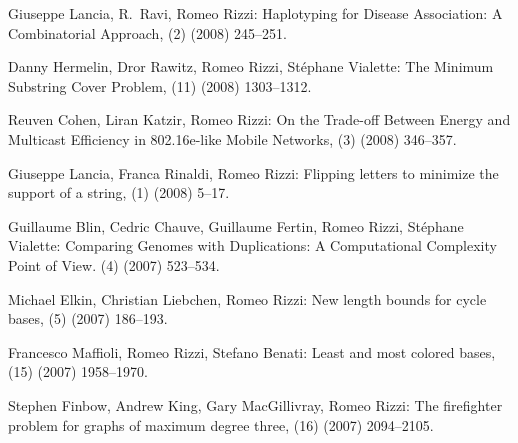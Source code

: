\begin{etaremune}
  \item {\sc Giuseppe Lancia, R.~Ravi, Romeo Rizzi:}
   \newblock  Haplotyping for Disease Association: A Combinatorial Approach, 
   (2) (2008) 245--251.

  \item {\sc Danny Hermelin, Dror Rawitz, Romeo Rizzi, St\'ephane Vialette:}
   \newblock  The Minimum Substring Cover Problem,
   (11) (2008) 1303--1312.

  \item {\sc Reuven Cohen, Liran Katzir, Romeo Rizzi:}
   \newblock   On the Trade-off Between Energy and Multicast Efficiency in 802.16e-like Mobile Networks,
   (3) (2008) 346--357.

  \item {\sc Giuseppe Lancia, Franca Rinaldi, Romeo Rizzi:}
   \newblock  Flipping letters to minimize the support of a string,
   (1) (2008) 5--17.

  \item {\sc Guillaume Blin, Cedric Chauve, Guillaume Fertin, Romeo Rizzi, St\'ephane Vialette:}
   \newblock  Comparing Genomes with Duplications: A Computational Complexity Point of View.
   (4) (2007) 523--534.

  \item {\sc Michael Elkin, Christian Liebchen, Romeo Rizzi:}
   \newblock  New length bounds for cycle bases,
   (5) (2007) 186--193.

  \item {\sc Francesco Maffioli, Romeo Rizzi, Stefano Benati:}
   \newblock  Least and most colored bases,
   (15) (2007) 1958--1970.

  \item {\sc Stephen Finbow, Andrew King, Gary MacGillivray, Romeo Rizzi:}
   \newblock  The firefighter problem for graphs of maximum degree three,
   (16) (2007) 2094--2105.


\end{etaremune}

